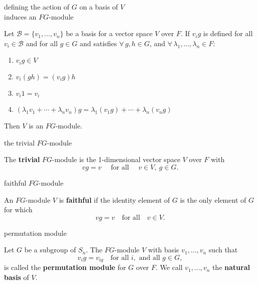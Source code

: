 \documentclass[avery5371,grid]{flashcards}
\newcommand{\B}{\mathscr{B}}
\newcommand{\defn}[1]{\textbf{#1}}
\begin{document}
\begin{flashcard}[Proposition 4.6]{defining the action of $G$ on a basis of $V$\\
  induces an $FG$-module}

  Let $\B=\{v_1, \ldots , v_n\}$ be a basis for a vector space $V$
  over $F$. If $v_i g$ is defined for all $v_i \in \B$ and for all
  $g\in G$ and satisfies $\forall \, g, h\in G$, and
  $\forall \, \lambda_1, \ldots, \lambda_n \in F$:
  \begin{enumerate}
  \item $v_i g \in V$
  \item $v_i(gh) = (v_i g)h$
  \item $v_i 1 = v_i$
  \item $(\lambda_1 v_1 + \cdots + \lambda_n v_n)g =
    \lambda_1(v_1 g) + \cdots + \lambda_n (v_n g)$
  \end{enumerate}
  Then $V$ is an $FG$-module.

\end{flashcard}

\begin{flashcard}[Definition]{the trivial $FG$-module}

  The \defn{trivial} $FG$-module is the 1-dimensional vector space $V$
  over $F$ with
  \[
    vg = v \quad \text{ for all } \quad v\in V, \: g\in G.
  \]

\end{flashcard}

\begin{flashcard}[Definition]{faithful $FG$-module}

  An $FG$-module $V$ is \defn{faithful} if the identity element of $G$
  is the only element of $G$ for which
  \[
    vg = v \quad \text{for all} \quad v\in V.
  \]

\end{flashcard}

\begin{flashcard}[Definition]{permutation module}

  Let $G$ be a subgroup of $S_n$. The $FG$-module $V$ with basis
  $v_1, \ldots, v_n$ such that
  \[
    v_i g = v_{ig} \quad \text{for all } i, \text{ and all } g\in G,
  \]
  is called the \defn{permutation module} for $G$ over $F$. We call
  $v_1, \ldots, v_n$ the \defn{natural basis} of $V$.

\end{flashcard}
\end{document}
